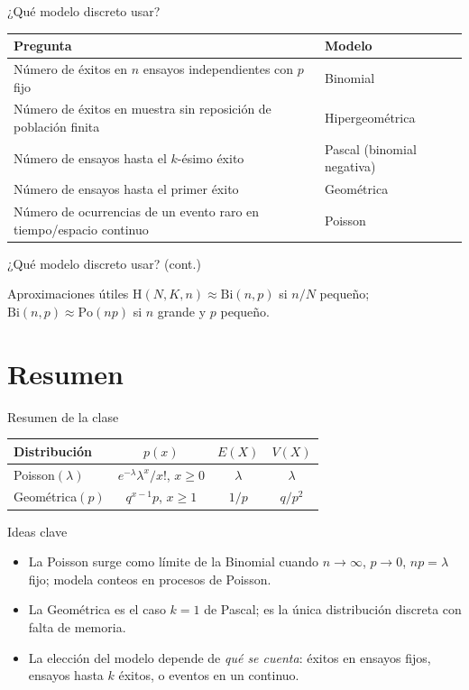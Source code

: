 \documentclass[aspectratio=169,11pt]{beamer}
\begin{document}
\begin{frame}{¿Qué modelo discreto usar?}
\begin{center}
\small
\begin{tabular}{p{4.3cm}p{6.5cm}}
\toprule
\textbf{Pregunta} & \textbf{Modelo} \\
\midrule
Número de éxitos en $n$ ensayos independientes con $p$ fijo & Binomial \\
Número de éxitos en muestra sin reposición de población finita & Hipergeométrica \\
Número de ensayos hasta el $k$-ésimo éxito & Pascal (binomial negativa) \\
Número de ensayos hasta el primer éxito & Geométrica \\
Número de ocurrencias de un evento raro en tiempo/espacio continuo & Poisson \\
\bottomrule
\end{tabular}
\end{center}
\end{frame}

\begin{frame}{¿Qué modelo discreto usar? (cont.)}
\begin{alertblock}{Aproximaciones útiles}
$\text{H}(N,K,n)\approx\text{Bi}(n,p)$ si $n/N$ pequeño; \quad $\text{Bi}(n,p)\approx\text{Po}(np)$ si $n$ grande y $p$ pequeño.
\end{alertblock}
\end{frame}

\section{Resumen}

\begin{frame}{Resumen de la clase}
\begin{center}
\small
\begin{tabular}{lccc}
\toprule
\textbf{Distribución} & \textbf{$p(x)$} & \textbf{$E(X)$} & \textbf{$V(X)$} \\
\midrule
Poisson$(\lambda)$ & $e^{-\lambda}\lambda^x/x!$, $x\ge0$ & $\lambda$ & $\lambda$ \\
Geométrica$(p)$ & $q^{x-1}p$, $x\ge1$ & $1/p$ & $q/p^2$ \\
\bottomrule
\end{tabular}
\end{center}

\begin{block}{Ideas clave}
\begin{itemize}
\item La Poisson surge como límite de la Binomial cuando $n\to\infty$, $p\to0$, $np=\lambda$ fijo; modela conteos en procesos de Poisson.
\item La Geométrica es el caso $k=1$ de Pascal; es la única distribución discreta con falta de memoria.
\item La elección del modelo depende de \emph{qué se cuenta}: éxitos en ensayos fijos, ensayos hasta $k$ éxitos, o eventos en un continuo.
\end{itemize}
\end{block}
\end{frame}
\end{document}
